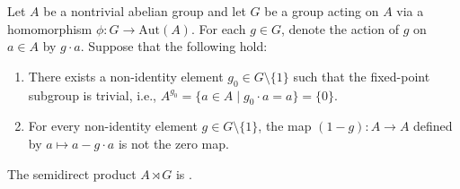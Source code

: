 \begin{theorem}
\label{theorem:semidirect_product_of_an_abelian_group_by_a_group_is_center_free_wheneever_fixed_point_subgroup_by_some_non_identity_elements_is_trivial_and_1_minus_non_identity_elements_are_non_zero_endomorphisms}
Let $A$ be a nontrivial abelian group and let $G$ be a group acting on $A$ via a homomorphism $\phi: G \to \text{Aut}(A)$. For each $g \in G$, denote the action of $g$ on $a \in A$ by $g \cdot a$. Suppose that the following hold:
\begin{enumerate}
    \item \label{cond:fixed_points_exist} There exists a non-identity element $g_0 \in G \setminus \{1\}$ such that the fixed-point subgroup is trivial, i.e., $A^{g_0} = \{a \in A \mid g_0 \cdot a = a\} = \{0\}$.
    \item \label{cond:image} For every non-identity element $g \in G \setminus \{1\}$, the map $(1 - g): A \to A$ defined by $a \mapsto a - g \cdot a$ is not the zero map.
\end{enumerate}
The semidirect product $A \rtimes G$ is .
\end{theorem}

